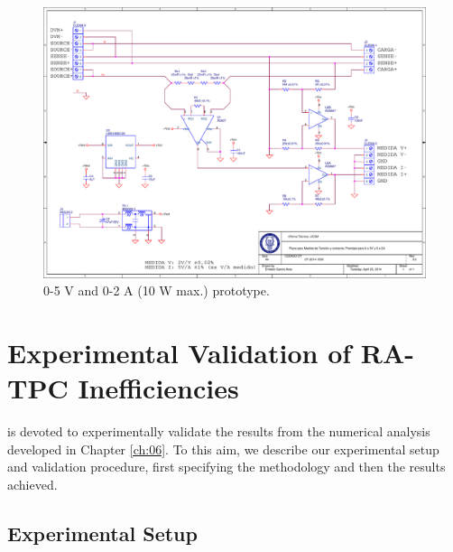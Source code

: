 \documentclass[twoside,nohyper]{tufte-book}
\newcommand{\restorewidth}{
  \restoregeometry
  \fancyhfoffset[RO]{{\marginparsep+\marginparwidth}}
}
\begin{document}
\begin{figure}

{\centering \includegraphics{img/03/schematic-v3} 

}

\caption[0-5 V and 0-2 A (10 W max.) prototype.]{0-5 V and 0-2 A (10 W max.) prototype.}\label{fig:schematicv3}
\end{figure}

\restorewidth

\hypertarget{experimental-validation-of-ra-tpc-inefficiencies}{%
\chapter{Experimental Validation of RA-TPC Inefficiencies}\label{experimental-validation-of-ra-tpc-inefficiencies}}

 is devoted to experimentally validate the results from the numerical analysis developed in Chapter \ref{ch:06}. To this aim, we describe our experimental setup and validation procedure, first specifying the methodology and then the results achieved.

\hypertarget{experimental-setup}{%
\section{Experimental Setup}\label{experimental-setup}}
\end{document}
